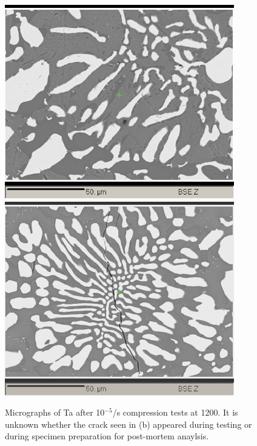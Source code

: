\begin{figure}[H]
\begin{center}
\includegraphics[width=10cm]{TaAle5i}
\includegraphics[width=10cm]{TaAle5ii}
\caption{Micrographs of Ta after 10$^{-5}$/s compression tests at 1200\celsius.  It is unknown whether the crack seen in (b) appeared during testing or during specimen preparation for post-mortem anaylsis.}
\label{fig:graph1_1BSE}
\end{center}
\end{figure}

